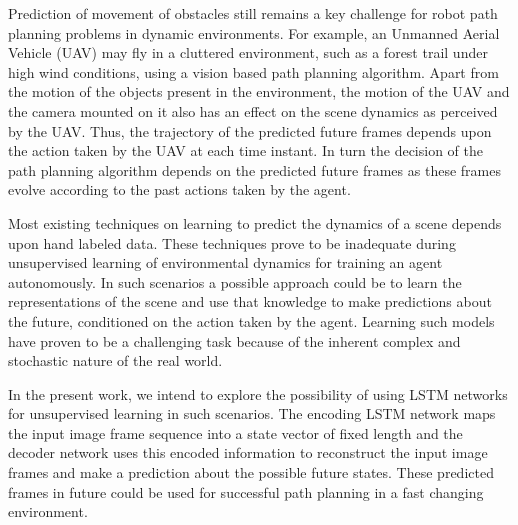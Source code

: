 \documentclass[sigconf]{acmart}
\begin{document}
Prediction of movement of obstacles still remains a key challenge for robot path planning problems in dynamic environments.  For example, an Unmanned Aerial Vehicle (UAV) may fly in a cluttered environment, such as  a forest trail under high wind conditions, using a vision based path planning algorithm. Apart from the motion of the objects present in the environment, the motion of the UAV and the camera mounted on it also has an effect on the scene dynamics as perceived by the UAV.  Thus, the trajectory of the predicted future frames depends upon the action taken by the UAV at each time instant. In turn the decision of the path planning algorithm depends on the predicted future frames as these frames evolve according to the past actions taken by the agent.


Most existing techniques on learning to predict the dynamics of a scene depends upon hand labeled data. These techniques prove to be inadequate during unsupervised learning of environmental dynamics for training an agent autonomously. In such scenarios a possible approach could be to learn the representations of the scene and use that knowledge to make predictions about the future, conditioned on the action taken by the agent. Learning such models have proven to be a challenging task \cite{finn} because of the inherent complex and stochastic nature of the real world.


In the present work, we intend to explore the possibility of using LSTM networks for unsupervised learning
in such scenarios. The encoding LSTM network maps the input
image frame sequence into a state vector of fixed length and the decoder network uses
this encoded information to reconstruct the input image frames and make a prediction about the
possible future states. These predicted frames in future could be used for successful path
planning in a fast changing environment.
\end{document}
